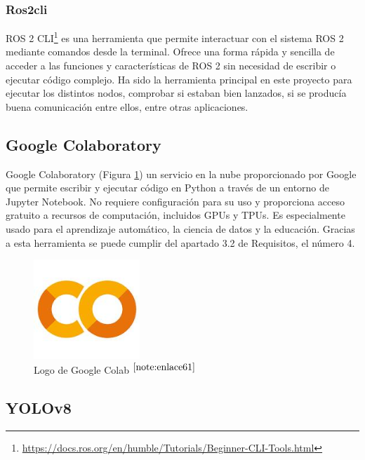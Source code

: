 \subsubsection{Ros2cli}

\acs{ROS} 2 \ac{CLI}\footnote{\url{https://docs.ros.org/en/humble/Tutorials/Beginner-CLI-Tools.html}} es una herramienta que permite interactuar con el sistema ROS 2 mediante comandos desde la terminal. Ofrece una forma rápida y sencilla de acceder a las funciones y características de \acs{ROS} 2 sin necesidad de escribir o ejecutar código complejo. Ha sido la herramienta principal en este proyecto para ejecutar los distintos nodos, comprobar si estaban bien lanzados, si se producía buena comunicación entre ellos, entre otras aplicaciones.


\subsection{Google Colaboratory}

Google Colaboratory (Figura \ref{fig:googlecolab}) un servicio en la nube proporcionado por Google que permite escribir y ejecutar código en Python a través de un entorno de Jupyter Notebook. No requiere configuración para su uso y proporciona acceso gratuito a recursos de computación, incluidos GPUs y TPUs. Es especialmente usado para el aprendizaje automático, la ciencia de datos y la educación. Gracias a esta herramienta se puede cumplir del apartado 3.2 de Requisitos, el número 4.

\begin{figure} [h!]
	\begin{center}
		\includegraphics[width=4cm]{figs/googlecolab.png}
	\end{center}
	\caption{Logo de Google Colab $^{\ref{note:enlace61}}$} 
	\label{fig:googlecolab}
\end{figure}

\setcounter{footnote}{61} %

\subsection{YOLOv8}

